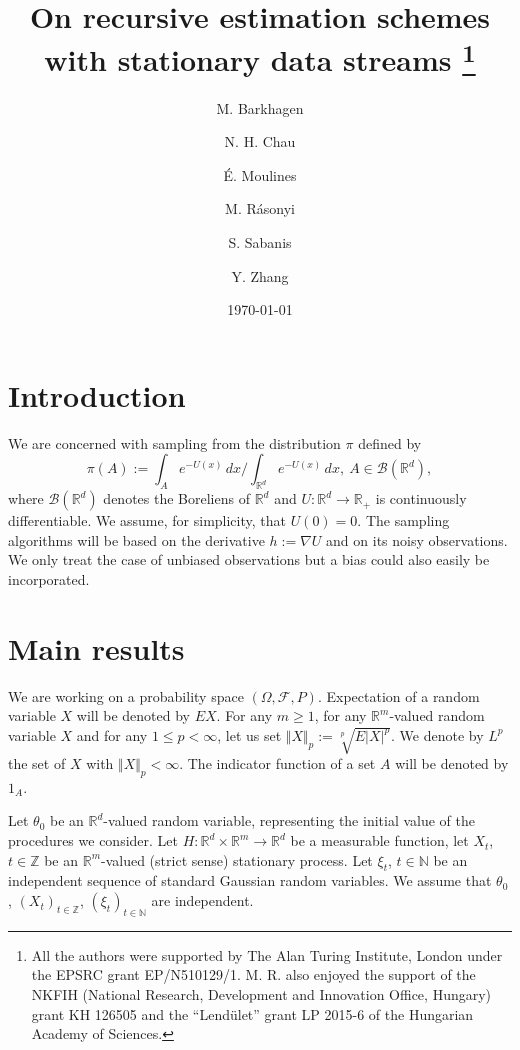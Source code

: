 \documentclass[a4paper,draft]{article}
\begin{document}
\title{On recursive estimation schemes\\ with stationary data streams
\thanks{All the authors
were supported
by The Alan Turing Institute, London under the EPSRC grant EP/N510129/1.
M. R. also enjoyed the support of the NKFIH (National Research, Development and Innovation Office, Hungary) 
grant KH 126505 and the ``Lend\"ulet'' grant LP 2015-6 of the
Hungarian Academy of Sciences.}}

\author{M. Barkhagen \and N. H. Chau \and \'E. Moulines \and 
M. R\'asonyi \and S. Sabanis \and Y. Zhang}

\date{\today}

\maketitle

\begin{abstract}

\end{abstract}

\section{Introduction}

We are concerned with sampling from the distribution $\pi$ defined by
$$
\pi(A):=\int_A e^{-U(x)}\, dx/\int_{\mathbb{R}^d} e^{-U(x)}\, dx,\
A\in\mathcal{B}(\mathbb{R}^d),
$$
where $\mathcal{B}(\mathbb{R}^d)$ denotes the Boreliens of $\mathbb{R}^d$
and $U:\mathbb{R}^d\to\mathbb{R}_+$ is continuously
differentiable. We assume, for simplicity,
that $U(0)=0$. The sampling algorithms will be based on 
the derivative $h:=\nabla U$ and on its noisy observations.
We only treat the case of unbiased observations but a bias
could also easily be incorporated.

\section{Main results}

We are working on a probability space $(\Omega,\mathcal{F},P)$.
Expectation of
a random variable $X$ will be denoted by $EX$.
For any $m\geq 1$, for any $\mathbb{R}^m$-valued random variable $X$ and for any $1\leq p<\infty$, let us set
$\Vert X\Vert_p:=\sqrt[p]{E|X|^p}$. We denote by $L^p$ the set of $X$ with $\Vert X\Vert_p<\infty$.
The indicator function of a set $A$ will be denoted by $1_A$.
 

Let $\theta_0$ be an $\mathbb{R}^d$-valued random variable, representing
the initial value of the procedures we consider.
Let $H:\mathbb{R}^d\times\mathbb{R}^m\to\mathbb{R}^d$ be a measurable
function, let $X_t$, $t\in\mathbb{Z}$ be an $\mathbb{R}^m$-valued (strict sense) stationary process. 
Let $\xi_t$, $t\in\mathbb{N}$ be an independent
sequence of standard Gaussian random variables. We assume that $\theta_0$, $(X_t)_{t\in\mathbb{Z}}$,
$(\xi_t)_{t\in\mathbb{N}}$ are independent. 
\end{document}
